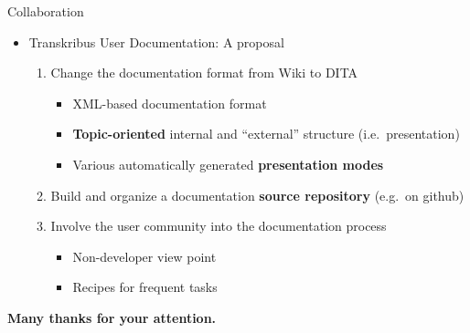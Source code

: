 \documentclass{bbawslides}
\begin{document}
\begin{bbawslide}{Collaboration}
  \vspace*{7mm}%
  \centerslidestrue%
  \begin{itemize}
    \item Transkribus User Documentation: A proposal
    \begin{enumerate}[leftmargin=*, align=left, label=\arabic*. Step:]\small
			\item Change the documentation format from Wiki to DITA
      \begin{itemize}\small
        \item XML-based documentation format
        \item \textbf{Topic-oriented} internal and \enquote{external} structure (i.e.~presentation)
        \item Various automatically generated \textbf{presentation modes}
      \end{itemize}
			\item Build and organize a documentation \textbf{source repository} (e.g.~on github)
      \item Involve the user community into the documentation process
      \begin{itemize}\small
        \item Non-developer view point
        \item Recipes for frequent tasks
      \end{itemize}
    \end{enumerate}
  \end{itemize}
\end{bbawslide}

\begin{bbawpart}{\Large\bf Many thanks for your attention.}
\end{bbawpart}
\end{document}
